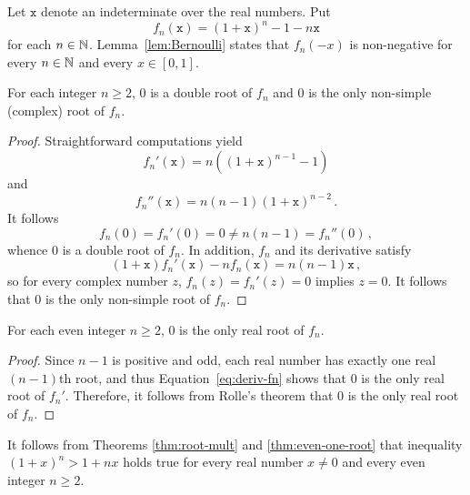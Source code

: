 
\newcommand{\ttx}{\mathtt{x}}

Let  $\ttx$ denote an indeterminate over the real numbers.
Put
$$
f_n(\ttx) = {(1 + \ttx)}^n - 1 - n \ttx 
$$
for each $n \in \mathbb{N}$.
Lemma~\ref{lem:Bernoulli} states that $f_n(- x)$ is non-negative for every $n \in \mathbb{N}$ and every $x \in [0, 1]$.

\begin{theorem} \label{thm:root-mult}
  For each integer $n \ge 2$,
  $0$ is a double root of $f_n$ and $0$ is the only non-simple (complex) root of $f_n$.
\end{theorem}

\begin{proof}
  Straightforward computations yield
  \begin{equation} \label{eq:deriv-fn} 
  f_n'(\ttx)  = n \left( {(1 + \ttx)}^{n - 1} -  1 \right) 
  \end{equation}
  and
  $$
  f_n''(\ttx)  = n (n - 1) {(1 + \ttx)}^{n - 2} \,.
  $$
  It follows
  $$
  f_n(0) = f_n'(0) = 0 \ne n (n - 1) = f_n''(0) \, ,
  $$
  whence $0$ is a double root of $f_n$.
  In addition, $f_n$ and its derivative satisfy 
   $$
   (1 + \ttx) f_n'(\ttx) - n f_n(\ttx) = n (n - 1) \ttx \, ,
   $$
   so for every complex number $z$, $f_n(z) = f_n'(z) = 0$ implies $z = 0$.
   It follows that $0$ is the only non-simple root of $f_n$.
\end{proof}

\begin{theorem} \label{thm:even-one-root}
  For each even integer $n \ge 2$,
  $0$ is the only real root of $f_n$.
 \end{theorem} 

 \begin{proof}
   Since $n - 1$ is positive and odd,
   each real number has exactly one real $(n - 1)$th root,
   and thus Equation~\eqref{eq:deriv-fn} shows that $0$ is the only real root of $f_n'$.
   Therefore, it follows from Rolle's theorem that $0$ is the only real root of $f_n$.
 \end{proof} 

 It follows from Theorems \ref{thm:root-mult} and \ref{thm:even-one-root} that
 inequality ${(1 + x)}^n > 1 + n x$ holds true for every real number $x \ne 0$ and every even integer $n \ge 2$.
 
